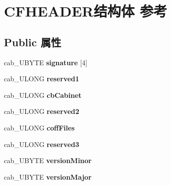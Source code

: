 \hypertarget{struct_c_f_h_e_a_d_e_r}{}\section{C\+F\+H\+E\+A\+D\+E\+R结构体 参考}
\label{struct_c_f_h_e_a_d_e_r}
\subsection*{Public 属性}
\begin{DoxyCompactItemize}
\item 
\mbox{\label{struct_c_f_h_e_a_d_e_r_afc1c99622293cc9926cae552eff9fbcb}} 
cab\+\_\+\+U\+B\+Y\+TE {\bfseries signature} \mbox{[}4\mbox{]}
\item 
\mbox{\label{struct_c_f_h_e_a_d_e_r_a0bb452ee13e64c9b1c5496f02e82e1bd}} 
cab\+\_\+\+U\+L\+O\+NG {\bfseries reserved1}
\item 
\mbox{\label{struct_c_f_h_e_a_d_e_r_acd7fc18adf4bfa2121cedad13a2f4cb1}} 
cab\+\_\+\+U\+L\+O\+NG {\bfseries cb\+Cabinet}
\item 
\mbox{\label{struct_c_f_h_e_a_d_e_r_a1b59e4b3f14323965ba1c7595bad7f79}} 
cab\+\_\+\+U\+L\+O\+NG {\bfseries reserved2}
\item 
\mbox{\label{struct_c_f_h_e_a_d_e_r_aa15c3a1fcac1b97930c28055876ebbaf}} 
cab\+\_\+\+U\+L\+O\+NG {\bfseries coff\+Files}
\item 
\mbox{\label{struct_c_f_h_e_a_d_e_r_ad99064f03b26c6b96068803fbbfea2c2}} 
cab\+\_\+\+U\+L\+O\+NG {\bfseries reserved3}
\item 
\mbox{\label{struct_c_f_h_e_a_d_e_r_a222dd668dff5891c9026b1b53ad4ce74}} 
cab\+\_\+\+U\+B\+Y\+TE {\bfseries version\+Minor}
\item 
\mbox{\label{struct_c_f_h_e_a_d_e_r_a1d6cbca9eab44c0f0f24d2360432c431}} 
cab\+\_\+\+U\+B\+Y\+TE {\bfseries version\+Major}
\item 
\mbox{\label{struct_c_f_h_e_a_d_e_r_ab79df1ecae94bd07c1dda5491a1ed01b}} 

\end{DoxyCompactItemize}
